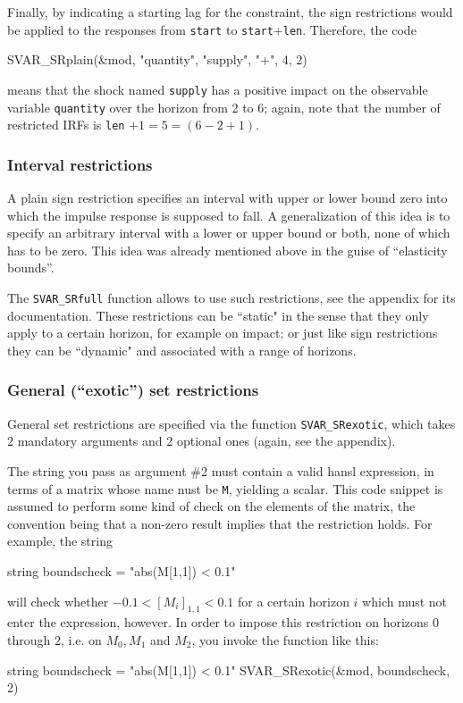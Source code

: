 \documentclass[a4paper,10pt]{article}
\begin{document}
Finally, by indicating a starting lag for the constraint, the sign
restrictions would be applied to the responses from \texttt{start} to
\texttt{start}+\texttt{len}. Therefore, the code
\begin{code}
SVAR_SRplain(&mod, "quantity", "supply", "+", 4, 2)
\end{code}
means that the shock named \texttt{supply} has a positive impact on the
observable variable \texttt{quantity} over the horizon from 2 to 6;
again, note that the number of restricted IRFs is \texttt{len}
$+1 = 5 = (6-2+1)$.

\subsubsection{Interval restrictions}

A plain sign restriction specifies an interval with upper or lower bound zero 
into which the impulse response is supposed to fall. A generalization of this idea is to 
specify an arbitrary interval with a lower or upper bound or both, none of which has 
to be zero. This idea was already mentioned above in the guise of ``elasticity bounds''.

The \texttt{SVAR\_SRfull} function allows to use such restrictions, see the appendix 
for its documentation. These restrictions can be ``static" in the sense that they only 
apply to a certain horizon, for example on impact; or just like sign restrictions they 
can be ``dynamic" and associated with a range of horizons. 


\subsubsection{General (``exotic'') set restrictions}

General set restrictions are specified via the function
\texttt{SVAR\_SRexotic}, which takes 2 mandatory arguments and 2 optional ones
(again, see the appendix).

The string you pass as argument \#2 must contain a valid hansl
expression, in terms of a matrix whose name nust be \texttt{M},
yielding a scalar. This code snippet is assumed to perform some kind
of check on the elements of the matrix, the convention being that a
non-zero result implies that the restriction holds. For example, the
string
\begin{code}
string boundscheck = "abs(M[1,1]) < 0.1"
\end{code}
will check whether $-0.1 < [M_i]_{1,1} < 0.1$ for a certain horizon $i$
which must not enter the expression, however. In order to impose
this restriction on horizons 0 through 2, i.e. on $M_0, M_1$ and $M_2$,
you invoke the function like this:
\begin{code}
string boundscheck = "abs(M[1,1]) < 0.1"
SVAR_SRexotic(&mod, boundscheck, 2)
\end{code}
\end{document}
